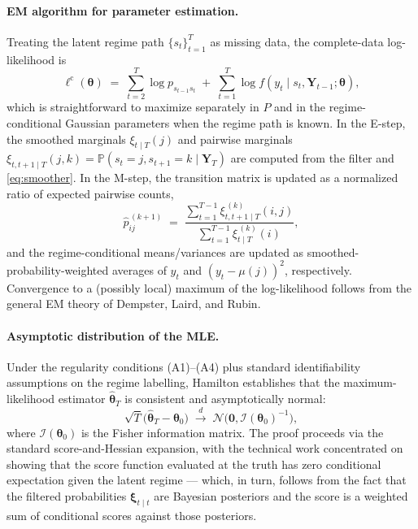 \documentclass[11pt]{article}
\begin{document}
\paragraph{EM algorithm for parameter estimation.}  Treating the latent regime path $\{s_t\}_{t=1}^{T}$ as missing data, the complete-data log-likelihood is
\begin{equation}
    \ell^{\mathrm{c}}(\bm{\theta}) \;=\; \sum_{t=2}^{T} \log p_{s_{t-1} s_t} \;+\; \sum_{t=1}^{T} \log f(y_t \mid s_t, \bm{Y}_{t-1}; \bm{\theta}),
\end{equation}
which is straightforward to maximize separately in $P$ and in the regime-conditional Gaussian parameters when the regime path is known.  In the E-step, the smoothed marginals $\xi_{t \mid T}(j)$ and pairwise marginals $\xi_{t,t+1 \mid T}(j,k) = \mathbb{P}(s_t=j, s_{t+1}=k \mid \bm{Y}_T)$ are computed from the filter and \eqref{eq:smoother}.  In the M-step, the transition matrix is updated as a normalized ratio of expected pairwise counts,
\begin{equation}
    \hat{p}_{ij}^{\,(k+1)} \;=\; \frac{ \sum_{t=1}^{T-1} \xi_{t,t+1 \mid T}^{\,(k)}(i,j) }{ \sum_{t=1}^{T-1} \xi_{t \mid T}^{\,(k)}(i) },
\end{equation}
and the regime-conditional means/variances are updated as smoothed-probability-weighted averages of $y_t$ and $(y_t - \mu(j))^2$, respectively.  Convergence to a (possibly local) maximum of the log-likelihood follows from the general EM theory of Dempster, Laird, and Rubin.

\paragraph{Asymptotic distribution of the MLE.}  Under the regularity conditions (A1)--(A4) plus standard identifiability assumptions on the regime labelling, Hamilton establishes that the maximum-likelihood estimator $\hat{\bm{\theta}}_T$ is consistent and asymptotically normal:
\begin{equation}
    \sqrt{T} \bigl( \hat{\bm{\theta}}_T - \bm{\theta}_0 \bigr) \;\xrightarrow{d}\; \mathcal{N}\!\bigl( \bm{0}, \mathcal{I}(\bm{\theta}_0)^{-1} \bigr),
\end{equation}
where $\mathcal{I}(\bm{\theta}_0)$ is the Fisher information matrix.  The proof proceeds via the standard score-and-Hessian expansion, with the technical work concentrated on showing that the score function evaluated at the truth has zero conditional expectation given the latent regime --- which, in turn, follows from the fact that the filtered probabilities $\bm{\xi}_{t \mid t}$ are Bayesian posteriors and the score is a weighted sum of conditional scores against those posteriors.
\end{document}
